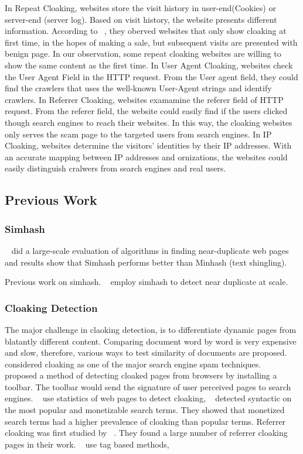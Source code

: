 In Repeat Cloaking, websites store the visit history in user-end(Cookies) or server-end (server log). Based on visit history, the website presents different information. 
According to ~\cite{wang2011cloak}, they oberved websites that only show cloaking at first time, in the hopes of making a sale, but subsequent visits are presented 
with benign page. In our observation, some repeat cloaking websites are willing to 
show the same content as the first time. 
In User Agent Cloaking, websites check the User Agent Field in the HTTP request. From the User agent field, they could find the crawlers that uses the well-known User-Agent
strings and identify crawlers.
In Referrer Cloaking, websites examamine the referer field of HTTP request. From the referer field, the website could easily find if the users clicked though search engines to
reach their websites. In this way, the cloaking websites only serves the scam page to the targeted users from search engines. 
In IP Cloaking, websites determine the visitors' identities by their IP addresses. With an accurate mapping between IP addresses
and ornizations, the websites could easily distinguish cralwers from search engines and real users. 


\subsection{Previous Work}
\subsubsection{Simhash}


~\cite{henzinger2006finding} did a large-scale evaluation of algorithms in
finding near-duplicate web pages and results show that Simhash performs better
than Minhash (text shingling).

Previous work on simhash. ~\cite{manku2007detecting} employ simhash to detect
near duplicate at scale.

\subsubsection{Cloaking Detection}
The major challenge in claoking detection, is to differentiate dynamic pages
from blatantly different content.
Comparing document word by word is very expensive and slow, therefore, 
various ways to test similarity of documents are proposed. 
~\cite{henzinger2002challenges}
 considered cloaking as one of the major search engine spam
techniques.
 ~\cite{najork2005system} proposed a method of detecting cloaked pages from browsers by
 installing a toolbar. The toolbar would send the signature of user perceived
 pages to search engines.
 ~\cite{wu2006detecting} use statistics of web pages to detect cloaking,
~\cite{chellapilla2006improving} detected syntactic on the most popular and
 monetizable search terms. They showed that monetized search terms had a higher
 prevalence of cloaking than popular terms.
 Referrer cloaking was first studied by ~\cite{wang2006detecting}. They found
 a large number of referrer cloaking pages in their work.
 ~\cite{lin2009detection} use tag based methods,

